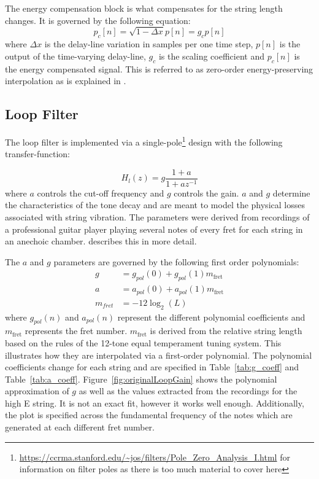 \documentclass[main.tex]{subfiles}
\begin{document}
The energy compensation block is what compensates for the string length changes. It is governed by the following equation:
\begin{equation}
    p_c[n] = \sqrt{1-\Delta x}p[n] = g_c p[n]
\end{equation}
where $\Delta x$ is the delay-line variation in samples per one time step, $p[n]$ is the output of the time-varying delay-line, $g_c$ is the scaling coefficient and $p_c[n]$ is the energy compensated signal. This is referred to as zero-order energy-preserving interpolation as is explained in .

\subsection{Loop Filter}
The loop filter is implemented via a single-pole\footnote{\url{https://ccrma.stanford.edu/~jos/filters/Pole_Zero_Analysis_I.html} for information on filter poles as there is too much material to cover here} design with the following transfer-function:

\begin{equation}
    H_l(z) = g \frac{1 + a}{1 + a z^{-1}}
    \label{eqn:one-pole}
\end{equation}
where $a$ controls the cut-off frequency and $g$ controls the gain. $a$ and $g$ determine the characteristics of the tone decay and are meant to model the physical losses associated with string vibration. The parameters were derived from recordings of a professional guitar player playing several notes of every fret for each string in an anechoic chamber.  describes this in more detail.

The $a$ and $g$ parameters are governed by the following first order polynomials:
\begin{align}
    g &= g_{pol}(0) + g_{pol}(1)m_{\text{fret}}\\
    a &= a_{pol}(0) + a_{pol}(1)m_{\text{fret}}\\
    \label{eq:fretNumber}
    m_{fret} &= -12\log_2(L)
\end{align}
where $g_{pol}(n)$ and $a_{pol}(n)$ represent the different polynomial coefficients and $m_{\text{fret}}$ represents the fret number. $m_{\text{fret}}$ is derived from the relative string length based on the rules of the 12-tone equal temperament tuning system. This illustrates how they are interpolated via a first-order polynomial. The polynomial coefficients change for each string and are specified in Table~\ref{tab:g_coeff} and Table~\ref{tab:a_coeff}. Figure~\ref{fig:originalLoopGain} shows the polynomial approximation of $g$ as well as the values extracted from the recordings for the high E string. It is not an exact fit, however it works well enough. Additionally, the plot is specified across the fundamental frequency of the notes which are generated at each different fret number.
\end{document}
